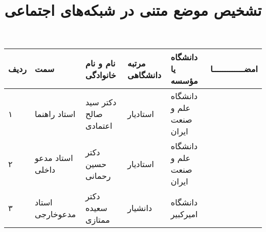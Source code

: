 



\subject{مهندسی کامپیوتر}


\title{تشخيص موضع متنی در شبکه‌های اجتماعی}






\firstPage
\besmPage
\davaranPage

\vspace{.5cm}

\begin{center}
	\begin{tabular}{| p{8mm} | p{18mm} | p{} |p{14mm}|p{}|c|}

		\hline
		ردیف	& سمت & نام و نام خانوادگی & مرتبه \newline دانشگاهی &	دانشگاه یا مؤسسه &	امضـــــــــــــا\\
		\hline
		۱  &	استاد راهنما & دکتر سید \newline  صالح اعتمادی & استادیار & دانشگاه \newline علم و صنعت ایران &  \\
		\hline
				۲  &	استاد \newline مدعو داخلی & دکتر  \newline  حسین رحمانی & استادیار & دانشگاه \newline علم و صنعت ایران &  \\
		
		\hline
				۳ &	 استاد \newline مدعو‌‌خارجی& دکتر  \newline سعیده ممتازی & دانشیار & دانشگاه امیرکبیر &  \\
		\hline

	\end{tabular}
\end{center}



\esalatPage
\mojavezPage
\newpage
\iffalse
\thispagestyle{empty}
\centerline{\Large \titlefont  تقـــدیم }
\begin{center}
	محل قرار گرفتن متن قـدرانی و تقدیم در نــسخه نهایی پایان‌نامه. 
\end{center}
\fi

